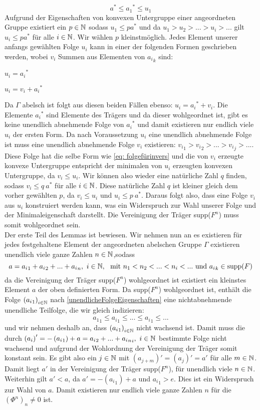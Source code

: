 {\[a^* \le {a_1}^* \le u_1\]
Aufgrund der Eigenschaften von konvexen Untergruppe einer angeordneten Gruppe existiert ein $p \in \mathbb{N}$ sodass $u_1 \le pa^*$ und da $u_1 > u_2 > ... > u_i > ...$ gilt $u_i \le pa^*$ für alle $i \in \mathbb{N}$. Wir wählen $p$ kleinstmöglich.
Jedes Element unserer anfangs gewählten Folge $u_i$ kann in einer der folgenden Formen geschrieben werden, wobei $v_i$ Summen aus Elementen von ${a_i}_k$ sind:
\begin{multicols}{2}
\item $u_i = {a_i}^*$
\item $u_i = v_i+{a_i}^*$
\end{multicols}
Da $\Gamma$ abelsch ist folgt aus diesen beiden Fällen ebenso: $u_i = {a_i}^* + v_i$. Die Elemente ${a_i}^*$ sind Elemente des Trägers und da dieser wohlgeordnet ist, gibt es keine unendlich abnehmende Folge von ${a_i}^*$ und damit existieren nur endlich viele $u_i$ der ersten Form. Da nach Voraussetzung $u_i$ eine unendlich abnehmende Folge ist muss eine unendlich abnehmende Folge $v_i$ existieren: ${v_i}_1 > {v_i}_2 > ... > {v_i}_j > ...$. Diese Folge hat die selbe Form wie \ref{eq: folgefürinvers} und die von $v_i$ erzeugte konvexe Untergruppe entspricht der minimalen von $u_i$ erzeugten konvexen Untergruppe, da $v_i \le u_i$. Wir können also wieder eine natürliche Zahl $q$ finden, sodass $v_i \le q~a^*$ für alle $i \in \mathbb{N}$. Diese natürliche Zahl $q$ ist kleiner gleich dem vorher gewählten $p$, da $v_i \le u_i$ und $u_i \le p~a^*$. Daraus folgt also, dass eine Folge $v_i$ aus $u_i$ konstruiert werden kann, was ein Widerspruch zur Wahl unserer Folge und der Minimaleigenschaft darstellt. Die Vereinigung der Träger supp($F^n$) muss somit wohlgeordnet sein. \\
Der erste Teil des Lemmas ist bewiesen. Wir nehmen nun an es existieren für jedes festgehaltene Element der angeordneten abelschen Gruppe $\Gamma$ existieren unendlich viele ganze Zahlen $n \in \mathbb{N}$,sodass \[a = {a_i}_1 +{a_i}_2 + ... + {a_i}_n,~ i \in \mathbb{N},~\text{ mit } n_1 < n_2 < ... < n_i < ...\text{ und } {a_i}_k \in \text{supp}(F)\]
da die Vereinigung der Träger supp($F^n$) wohlgeordnet ist existiert ein kleinstes Element $a$ der oben definierten Form. Da supp($F^n$) wohlgeordnet ist, enthält die Folge $\left({a_i}_1\right)_{i\in \mathbb{N}}$ nach \ref{unendlicheFolgeEigenschaften} eine nichtabnehmende unendliche Teilfolge, die wir gleich indizieren:
\[{a_1}_1 \le {a_i}_1 \le ... \le {a_i}_1 \le ...\] und wir nehmen deshalb an, dass $\left({a_i}_1\right)_{i\in \mathbb{N}}$ nicht wachsend ist. Damit muss die durch $\left(a_i\right)' = -\left({a_i}_1\right) + a = {a_i}_2 + ... + {{a_i}_n}_i,~ i \in \mathbb{N}$ bestimmte Folge nicht wachsend und aufgrund der Wohlordnung der Vereinigung der Träger somit konstant sein. Es gibt also ein $j \in \mathbb{N}$ mit $\left(a_{j+m}\right)' = \left(a_j\right)' = a'$ für alle $m \in \mathbb{N}$. Damit liegt $a'$ in der Vereinigung der Träger supp($F^n$), für unendlich viele $n\in \mathbb{N}$. Weiterhin gilt $a' < a$, da $a' = -\left({a_i}_1\right) + a$ und ${a_i}_1 >e$. Dies ist ein Widerspruch zur Wahl von $a$. Damit existieren nur endlich viele ganze Zahlen $n$ für die $\left(\Phi^n\right)_n \neq 0$ ist.
}
